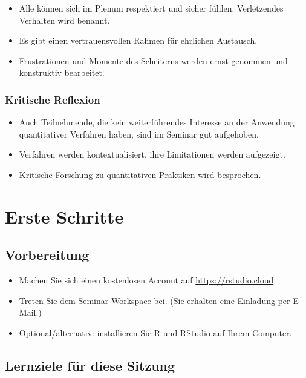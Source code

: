 \documentclass[11pt,german,a4paper]{article}
\providecommand{\tightlist}{%
  \setlength{\itemsep}{0pt}\setlength{\parskip}{0pt}}
\begin{document}
\begin{itemize}
\tightlist
\item
  Alle können sich im Plenum respektiert und sicher fühlen. Verletzendes Verhalten wird benannt.
\item
  Es gibt einen vertrauensvollen Rahmen für ehrlichen Austausch.
\item
  Frustrationen und Momente des Scheiterns werden ernst genommen und konstruktiv bearbeitet.
\end{itemize}

\hypertarget{kritische-reflexion}{%
\subsubsection{Kritische Reflexion}\label{kritische-reflexion}}

\begin{itemize}
\tightlist
\item
  Auch Teilnehmende, die kein weiterführendes Interesse an der Anwendung quantitativer Verfahren haben, sind im Seminar gut aufgehoben.
\item
  Verfahren werden kontextualisiert, ihre Limitationen werden aufgezeigt.
\item
  Kritische Forschung zu quantitativen Praktiken wird besprochen.
\end{itemize}

\hypertarget{erste-schritte}{%
\section{Erste Schritte}\label{erste-schritte}}

\hypertarget{vorbereitung}{%
\subsection{Vorbereitung}\label{vorbereitung}}

\begin{itemize}
\tightlist
\item
  Machen Sie sich einen kostenlosen Account auf \url{https://rstudio.cloud}
\item
  Treten Sie dem Seminar-Workspace bei. (Sie erhalten eine Einladung per E-Mail.)
\item
  Optional/alternativ: installieren Sie \href{https://www.r-project.org/}{R} und \href{https://rstudio.com/}{RStudio} auf Ihrem Computer.
\end{itemize}

\hypertarget{lernziele-fuxfcr-diese-sitzung}{%
\subsection{Lernziele für diese Sitzung}\label{lernziele-fuxfcr-diese-sitzung}}
\end{document}
